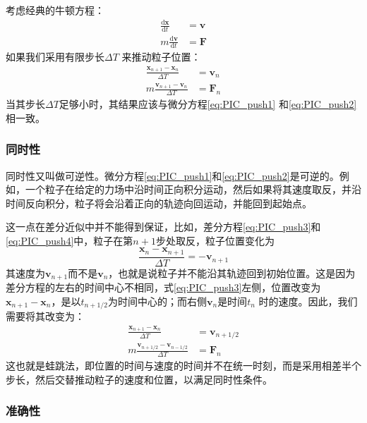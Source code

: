{      考虑经典的牛顿方程：
      \begin{align}
        \label{eq:PIC_push1}
         \frac{\mathrm{d} \mathbf{x}}{\mathrm{d} t} &= \mathbf{v}  \\
        \label{eq:PIC_push2}
        m\frac{\mathrm{d} \mathbf{v}}{\mathrm{d} t} &= \mathbf{F}
      \end{align}
      如果我们采用有限步长$\Delta T$ 来推动粒子位置：
      \begin{align}
         \label{eq:PIC_push3}
         \frac{\mathbf{x}_{n+1}-\mathbf{x}_n}{\Delta T} &= \mathbf{v}_n  \\
         \label{eq:PIC_push4}
          m\frac{\mathbf{v}_{n+1}-\mathbf{v}_n}{\Delta T} &= \mathbf{F}_n
      \end{align}
      当其步长$\Delta T$足够小时，其结果应该与微分方程\ref{eq:PIC_push1} 和\ref{eq:PIC_push2}相一致。
\subsubsection{同时性}
      同时性又叫做可逆性。微分方程\ref{eq:PIC_push1}和\ref{eq:PIC_push2}是可逆的。例如，一个粒子在给定的力场中沿时间正向积分运动，然后如果将其速度取反，并沿时间反向积分，粒子将会沿着正向的轨迹向回运动，并能回到起始点。

      这一点在差分近似中并不能得到保证，比如，差分方程\ref{eq:PIC_push3}和\ref{eq:PIC_push4}中，粒子在第$n+1$步处取反，粒子位置变化为
      \begin{equation}
         \label{eq:PIC_push5}
         \frac{\mathbf{x}_{n}-\mathbf{x}_{n+1}}{\Delta T} = -\mathbf{v}_{n+1}
      \end{equation}
      其速度为$\mathbf{v}_{n+1}$而不是$\mathbf{v}_{n}$，也就是说粒子并不能沿其轨迹回到初始位置。这是因为差分方程的左右的时间中心不相同，式\ref{eq:PIC_push3}左侧，位置改变为$\mathbf{x}_{n+1}-\mathbf{x}_n$，是以$t_{n+1/2}$为时间中心的；而右侧$\mathbf{v}_n$是时间$t_{n}$ 时的速度。因此，我们需要将其改变为：
      \begin{align}
         \label{eq:PIC_push6}
         \frac{\mathbf{x}_{n+1}-\mathbf{x}_n}{\Delta T} &= \mathbf{v}_{n+1/2}  \\
         \label{eq:PIC_push7}
          m\frac{\mathbf{v}_{n+1/2}-\mathbf{v}_{n-1/2}}{\Delta T} &= \mathbf{F}_n
      \end{align}
      这也就是蛙跳法，即位置的时间与速度的时间并不在统一时刻，而是采用相差半个步长，然后交替推动粒子的速度和位置，以满足同时性条件。
\subsubsection{准确性}

}
